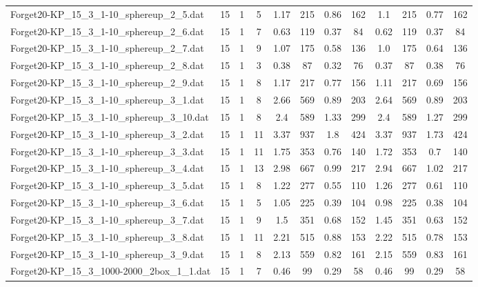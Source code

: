 \begin{sidewaystable}[!ht]
{\begin{tabular}{lccccccccccc}
Forget20-KP\_15\_3\_1-10\_sphereup\_2\_5.dat & 15 & 1 & 5 & 1.17 & 215 & 0.86 & 162 & 1.1 & 215 &  \textcolor{blue2}{0.77} & 162 \\
Forget20-KP\_15\_3\_1-10\_sphereup\_2\_6.dat & 15 & 1 & 7 & 0.63 & 119 &  \textcolor{blue2}{0.37} & 84 & 0.62 & 119 &  \textcolor{blue2}{0.37} & 84 \\
Forget20-KP\_15\_3\_1-10\_sphereup\_2\_7.dat & 15 & 1 & 9 & 1.07 & 175 &  \textcolor{blue2}{0.58} & 136 & 1.0 & 175 & 0.64 & 136 \\
Forget20-KP\_15\_3\_1-10\_sphereup\_2\_8.dat & 15 & 1 & 3 & 0.38 & 87 &  \textcolor{blue2}{0.32} & 76 & 0.37 & 87 & 0.38 & 76 \\
Forget20-KP\_15\_3\_1-10\_sphereup\_2\_9.dat & 15 & 1 & 8 & 1.17 & 217 & 0.77 & 156 & 1.11 & 217 &  \textcolor{blue2}{0.69} & 156 \\
Forget20-KP\_15\_3\_1-10\_sphereup\_3\_1.dat & 15 & 1 & 8 & 2.66 & 569 & 0.89 & 203 & 2.64 & 569 & 0.89 & 203 \\
Forget20-KP\_15\_3\_1-10\_sphereup\_3\_10.dat & 15 & 1 & 8 & 2.4 & 589 & 1.33 & 299 & 2.4 & 589 &  \textcolor{blue2}{1.27} & 299 \\
Forget20-KP\_15\_3\_1-10\_sphereup\_3\_2.dat & 15 & 1 & 11 & 3.37 & 937 & 1.8 & 424 & 3.37 & 937 &  \textcolor{blue2}{1.73} & 424 \\
Forget20-KP\_15\_3\_1-10\_sphereup\_3\_3.dat & 15 & 1 & 11 & 1.75 & 353 & 0.76 & 140 & 1.72 & 353 &  \textcolor{blue2}{0.7} & 140 \\
Forget20-KP\_15\_3\_1-10\_sphereup\_3\_4.dat & 15 & 1 & 13 & 2.98 & 667 &  \textcolor{blue2}{0.99} & 217 & 2.94 & 667 & 1.02 & 217 \\
Forget20-KP\_15\_3\_1-10\_sphereup\_3\_5.dat & 15 & 1 & 8 & 1.22 & 277 &  \textcolor{blue2}{0.55} & 110 & 1.26 & 277 & 0.61 & 110 \\
Forget20-KP\_15\_3\_1-10\_sphereup\_3\_6.dat & 15 & 1 & 5 & 1.05 & 225 & 0.39 & 104 & 0.98 & 225 &  \textcolor{blue2}{0.38} & 104 \\
Forget20-KP\_15\_3\_1-10\_sphereup\_3\_7.dat & 15 & 1 & 9 & 1.5 & 351 & 0.68 & 152 & 1.45 & 351 &  \textcolor{blue2}{0.63} & 152 \\
Forget20-KP\_15\_3\_1-10\_sphereup\_3\_8.dat & 15 & 1 & 11 & 2.21 & 515 & 0.88 & 153 & 2.22 & 515 & 0.78 & 153 \\
Forget20-KP\_15\_3\_1-10\_sphereup\_3\_9.dat & 15 & 1 & 8 & 2.13 & 559 &  \textcolor{blue2}{0.82} & 161 & 2.15 & 559 & 0.83 & 161 \\
Forget20-KP\_15\_3\_1000-2000\_2box\_1\_1.dat & 15 & 1 & 7 & 0.46 & 99 &  \textcolor{blue2}{0.29} & 58 & 0.46 & 99 &  \textcolor{blue2}{0.29} & 58 \\

\end{tabular}}
\end{sidewaystable}
